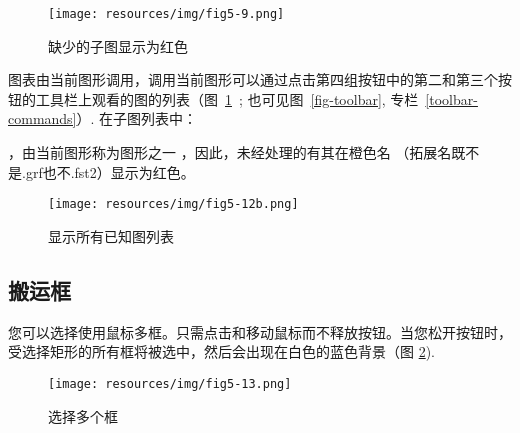 
\begin{figure}[h!]
\begin{center}
\texttt{[image: resources/img/fig5-9.png]}
\caption{缺少的子图显示为红色}
\end{center}
\end{figure}


\bigskip

\bigskip
\noindent 图表由当前图形调用，调用当前图形可以通过点击第四组按钮中的第二和第三个按钮的工具栏上观看的图的列表（图~\ref{list-called-graphs}~; 也可见图~\ref{fig-toolbar}, 专栏~\ref{toolbar-commands}）.
在子图列表中：
\begin{itemize}
，由当前图形称为图形之一
，因此，未经处理的有其在橙色名
（拓展名既不是.grf也不.fst2）显示为红色。
\end{itemize}

\begin{figure}[!h]
\begin{center}
\texttt{[image: resources/img/fig5-12b.png]}
\caption{显示所有已知图列表\label{list-called-graphs}}
\end{center}
\end{figure}



\subsection{搬运框}

您可以选择使用鼠标多框。只需点击和移动鼠标而不释放按钮。当您松开按钮时，受选择矩形的所有框将被选中，然后会出现在白色的蓝色背景（图 \ref{multi-selection}).

\begin{figure}[!ht]
\begin{center}
\texttt{[image: resources/img/fig5-13.png]}
\caption{选择多个框\label{multi-selection}}
\end{center}
\end{figure}

